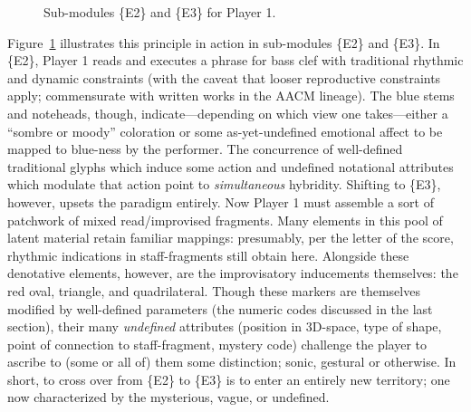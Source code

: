           \begin{figure} 
                \centering
                \captionsetup{width=.5\textwidth}
                \caption[Sub-modules \{E2\} and \{E3\} for Player 1.]{Sub-modules \{E2\} and \{E3\} for Player 1.\footnotemark}
                \label{fig:e2e3}
            \end{figure}
                
        Figure~\ref{fig:e2e3} illustrates this principle in action in sub-modules \{E2\} and \{E3\}. In \{E2\}, Player 1  reads and executes a phrase for bass clef with traditional rhythmic and dynamic constraints (with the caveat that looser reproductive constraints apply; commensurate with written works in the AACM lineage). The blue stems and noteheads, though, indicate---depending on which view one takes---either a ``sombre or moody'' coloration or some as-yet-undefined emotional affect to be mapped to blue-ness by the performer. The concurrence of well-defined traditional glyphs which induce some action and undefined notational attributes which modulate that action point to \textit{simultaneous} hybridity. Shifting to \{E3\}, however, upsets the paradigm entirely. Now Player 1 must assemble a sort of patchwork of mixed read/improvised fragments. Many elements in this pool of latent material retain familiar mappings: presumably, per the letter of the score, rhythmic indications in staff-fragments still obtain here. Alongside these denotative elements, however, are the improvisatory inducements themselves: the red oval, triangle, and quadrilateral. Though these markers are themselves modified by well-defined parameters (the numeric codes discussed in the last section), their many \textit{undefined} attributes (position in 3D-space, type of shape, point of connection to staff-fragment, mystery code) challenge the player to ascribe to (some or all of) them some distinction; sonic, gestural or otherwise. In short, to cross over from \{E2\} to \{E3\} is to enter an entirely new territory; one now characterized by the mysterious, vague, or undefined. 

